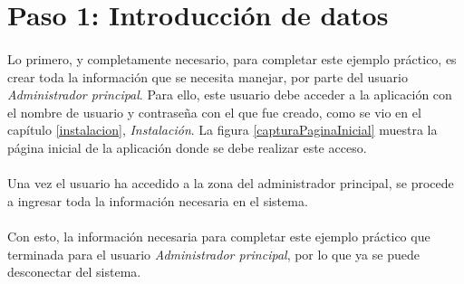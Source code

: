 \section{Paso 1: Introducción de datos}

  \paragraph{}Lo primero, y completamente necesario, para completar este
  ejemplo práctico, es crear toda la información que se necesita manejar, por
  parte del usuario \textit{Administrador principal}. Para ello, este usuario
  debe acceder a la aplicación con el nombre de usuario y contraseña con el que
  fue creado, como se vio en el capítulo \ref{instalacion},
  \textit{Instalación}. La figura \ref{capturaPaginaInicial} muestra la página
  inicial de la aplicación donde se debe realizar este acceso.

  \paragraph{}Una vez el usuario ha accedido a la zona del administrador
  principal, se procede a ingresar toda la información necesaria en el sistema.

  
  
  
  
  
  
  
  
  
  

  \paragraph{}Con esto, la información necesaria para completar este ejemplo
  práctico que terminada para el usuario \textit{Administrador principal}, por
  lo que ya se puede desconectar del sistema.

